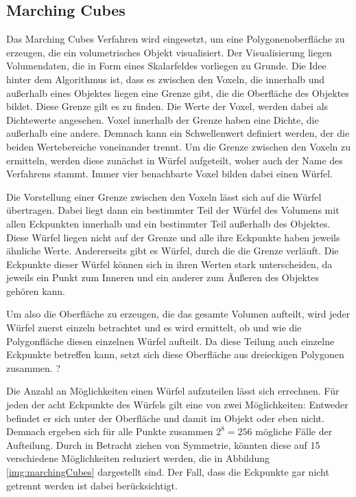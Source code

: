 

\subsection{Marching Cubes}
\label{marchingCubes}

Das Marching Cubes Verfahren wird eingesetzt, um eine Polygonenoberfläche zu erzeugen, die ein volumetrisches Objekt visualisiert. 
Der Visualisierung liegen Volumendaten, die in Form eines Skalarfeldes vorliegen zu Grunde.
Die Idee hinter dem Algorithmus ist, dass es zwischen den Voxeln, die innerhalb und außerhalb eines Objektes liegen eine Grenze gibt, die die Oberfläche des Objektes bildet. Diese Grenze gilt es zu finden. 
Die Werte der Voxel, werden dabei als Dichtewerte angesehen. Voxel innerhalb der Grenze haben eine Dichte, die außerhalb eine andere. Demnach kann ein Schwellenwert definiert werden, der die beiden Wertebereiche voneinander trennt.
Um die Grenze zwischen den Voxeln zu ermitteln, werden diese zunächst in Würfel aufgeteilt, woher auch der Name des Verfahrens stammt. Immer vier benachbarte Voxel bilden dabei einen Würfel.  

Die Vorstellung einer Grenze zwischen den Voxeln lässt sich auf die Würfel übertragen. Dabei liegt dann ein bestimmter Teil der Würfel des Volumens mit allen Eckpunkten innerhalb und ein bestimmter Teil außerhalb des Objektes. Diese Würfel liegen nicht auf der Grenze und alle ihre Eckpunkte haben jeweils ähnliche Werte. Andererseits gibt es Würfel, durch die die Grenze verläuft. Die Eckpunkte dieser Würfel können sich in ihren Werten stark unterscheiden, da jeweils ein Punkt zum Inneren und ein anderer zum Äußeren des Objektes gehören kann. 

Um also die Oberfläche zu erzeugen, die das gesamte Volumen aufteilt, wird jeder Würfel zuerst einzeln betrachtet und es wird ermittelt, ob und wie die Polygonfläche diesen einzelnen Würfel aufteilt.  Da diese Teilung auch einzelne Eckpunkte betreffen kann, setzt sich diese Oberfläche aus dreieckigen Polygonen zusammen. ?

Die Anzahl an Möglichkeiten einen Würfel aufzuteilen lässt sich errechnen. Für jeden der acht Eckpunkte des Würfels gilt eine von zwei Möglichkeiten: Entweder befindet er sich unter der Oberfläche und damit im Objekt oder eben nicht. Demnach ergeben sich für alle Punkte zusammen $2^8=256$ mögliche Fälle der Aufteilung. \cite{aigner07} Durch in Betracht ziehen von Symmetrie, könnten diese auf 15 verschiedene Möglichkeiten reduziert werden, die in Abbildung \ref{img:marchingCubes} dargestellt sind. Der Fall, dass die Eckpunkte gar nicht getrennt werden ist dabei berücksichtigt. 

